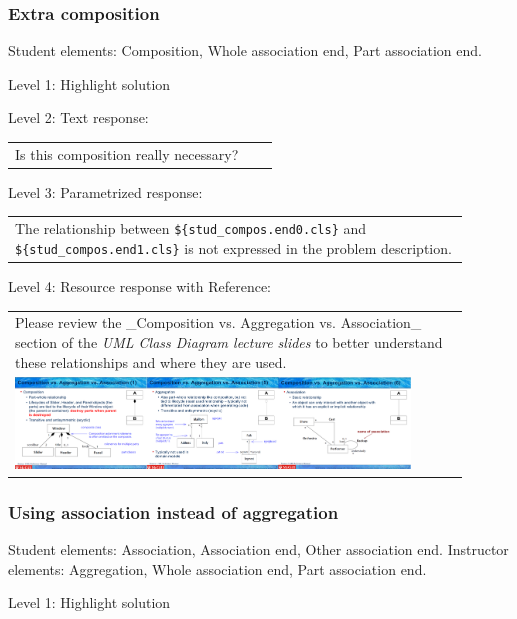 \subsubsection{Extra composition}

Student elements: Composition, Whole association end, Part association end.  \medskip

\noindent Level 1: Highlight solution  \medskip

\noindent Level 2: Text response: \medskip

\begin{tabular}{|p{0.9\linewidth}}
Is this composition really necessary?
\end{tabular} \medskip

\noindent Level 3: Parametrized response: \medskip

\begin{tabular}{|p{0.9\linewidth}}
The relationship between \verb|${stud_compos.end0.cls}| and \verb|${stud_compos.end1.cls}| is not expressed in the problem description.
\end{tabular} \medskip

\noindent Level 4: Resource response with Reference: \medskip

\begin{tabular}{|p{0.9\linewidth}}
Please review the _Composition vs. Aggregation vs. Association_ section of 
the \textit{UML Class Diagram lecture slides} to 
better understand these relationships and where they are used.

\\
\includegraphics[width=0.9\textwidth]{images/composition_aggregation_association.png}
\end{tabular} \medskip


\subsubsection{Using association instead of aggregation}

Student elements: Association, Association end, Other association end. Instructor elements: Aggregation, Whole association end, Part association end. \medskip

\noindent Level 1: Highlight solution  \medskip

